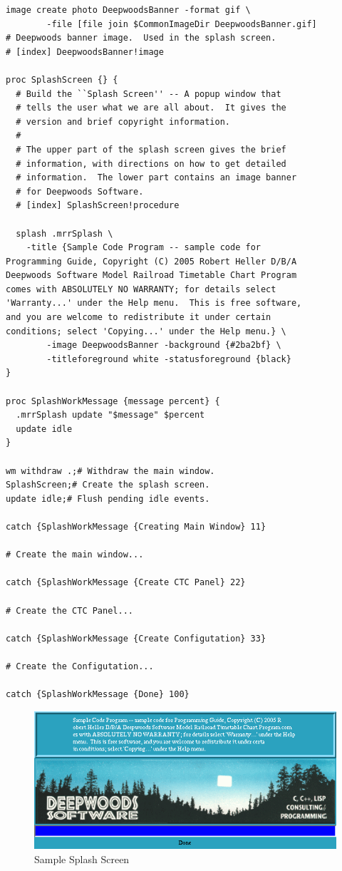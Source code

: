 \begin{lstlisting}[caption={Typical usage},label={lst:SPL:typicalUsage}]
image create photo DeepwoodsBanner -format gif \
        -file [file join $CommonImageDir DeepwoodsBanner.gif]
# Deepwoods banner image.  Used in the splash screen.
# [index] DeepwoodsBanner!image

proc SplashScreen {} {
  # Build the ``Splash Screen'' -- A popup window that 
  # tells the user what we are all about.  It gives the 
  # version and brief copyright information.
  #
  # The upper part of the splash screen gives the brief 
  # information, with directions on how to get detailed 
  # information.  The lower part contains an image banner 
  # for Deepwoods Software.
  # [index] SplashScreen!procedure

  splash .mrrSplash \
	-title {Sample Code Program -- sample code for 
Programming Guide, Copyright (C) 2005 Robert Heller D/B/A 
Deepwoods Software Model Railroad Timetable Chart Program 
comes with ABSOLUTELY NO WARRANTY; for details select 
'Warranty...' under the Help menu.  This is free software, 
and you are welcome to redistribute it under certain 
conditions; select 'Copying...' under the Help menu.} \
        -image DeepwoodsBanner -background {#2ba2bf} \
        -titleforeground white -statusforeground {black}
}

proc SplashWorkMessage {message percent} {
  .mrrSplash update "$message" $percent
  update idle
}

wm withdraw .;# Withdraw the main window.
SplashScreen;# Create the splash screen.
update idle;# Flush pending idle events.

catch {SplashWorkMessage {Creating Main Window} 11}

# Create the main window...

catch {SplashWorkMessage {Create CTC Panel} 22}

# Create the CTC Panel...

catch {SplashWorkMessage {Create Configutation} 33}

# Create the Configutation...

catch {SplashWorkMessage {Done} 100}

\end{lstlisting}
\begin{figure}[hbpt]
\begin{centering}
\includegraphics{SplashScreen.png}
\caption{Sample Splash Screen}
\label{fig:SPL:SplashScreen}
\end{centering}
\end{figure}
